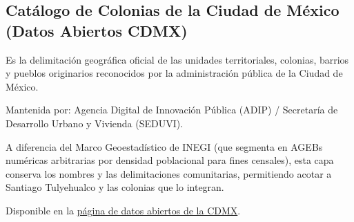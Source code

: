 \documentclass[
  spanish,
  letterpaper,
  DIV=11,
  numbers=noendperiod]{scrartcl}
\begin{document}
\subsection{Catálogo de Colonias de la Ciudad de México (Datos Abiertos
CDMX)}\label{catuxe1logo-de-colonias-de-la-ciudad-de-muxe9xico-datos-abiertos-cdmx}

Es la delimitación geográfica oficial de las unidades territoriales,
colonias, barrios y pueblos originarios reconocidos por la
administración pública de la Ciudad de México.

Mantenida por: Agencia Digital de Innovación Pública (ADIP) / Secretaría
de Desarrollo Urbano y Vivienda (SEDUVI).

A diferencia del Marco Geoestadístico de INEGI (que segmenta en AGEBs
numéricas arbitrarias por densidad poblacional para fines censales),
esta capa conserva los nombres y las delimitaciones comunitarias,
permitiendo acotar a Santiago Tulyehualco y las colonias que lo
integran.

Disponible en la
\href{https://datos.cdmx.gob.mx/dataset/catalogo-de-colonias-datos-abiertos}{página
de datos abiertos de la CDMX}.
\end{document}
